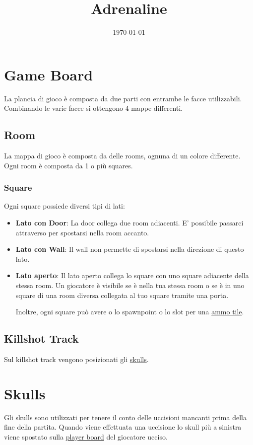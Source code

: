 \documentclass[a4paper, 12pt]{article}
\title{Adrenaline}
\date{\today}
\begin{document}
\maketitle

\newpage

\tableofcontents

\newpage
\section{Game Board} \label{sec:game-board}
	La plancia di gioco è composta da due parti con entrambe le facce utilizzabili.
	Combinando le varie facce si ottengono 4 mappe differenti.
	\subsection{Room} \label{sec:room}
		La mappa di gioco è composta da delle rooms, ognuna di un colore differente.
		Ogni room è composta da 1 o più squares.
		\subsubsection{Square} \label{sec:square}
		 	Ogni square possiede diversi tipi di lati:
		 	\begin{itemize}
		 		\item \textbf{Lato con Door}: La door collega due room adiacenti. 
		 		E' possibile passarci attraverso per spostarsi nella room accanto.
		 		\item \textbf{Lato con Wall}: Il wall non permette di spostarsi nella direzione di questo lato.
		 		\item \textbf{Lato aperto}: Il lato aperto collega lo square con uno square adiacente della stessa room.
		 	Un giocatore è visibile se è nella tua stessa room o se è in uno square di una room diversa collegata al tuo square tramite una porta.
		 	
		 	Inoltre, ogni square può avere o lo spawnpoint o lo slot per una \hyperref[sec:ammo-tiles]{ammo tile}.
		 	\end{itemize}
	\subsection{Killshot Track} \label{sec:killshot-track}
		Sul killshot track vengono posizionati gli \hyperref[sec:skulls]{skulls}.

\section{Skulls} \label{sec:skulls}
	Gli skulls sono utilizzati per tenere il conto delle uccisioni mancanti prima della fine della partita.
	Quando viene effettuata una uccisione lo skull più a sinistra viene spostato sulla \hyperref[sec:player-board]{player board} del giocatore ucciso. 
\end{document}
